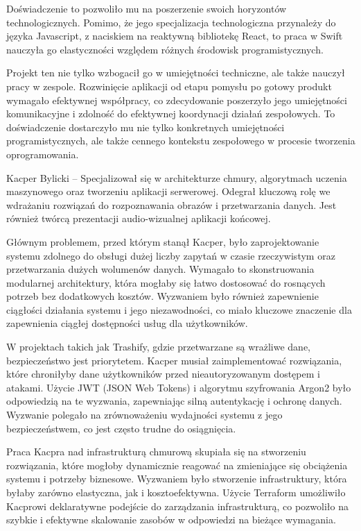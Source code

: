 \documentclass[12pt, a4paper, twoside, openany]{book}
\begin{document}
{Doświadczenie to pozwoliło mu na poszerzenie swoich horyzontów technologicznych. Pomimo, że jego specjalizacja technologiczna przynależy do języka Javascript, z naciskiem na reaktywną bibliotekę React, to praca w Swift nauczyła go elastyczności względem różnych środowisk programistycznych.

Projekt ten nie tylko wzbogacił go w umiejętności techniczne, ale także nauczył pracy w zespole. Rozwinięcie aplikacji od etapu pomysłu po gotowy produkt wymagało efektywnej współpracy, co zdecydowanie poszerzyło jego umiejętności komunikacyjne i zdolność do efektywnej koordynacji działań zespołowych. To doświadczenie dostarczyło mu nie tylko konkretnych umiejętności programistycznych, ale także cennego kontekstu zespołowego w procesie tworzenia oprogramowania.

Kacper Bylicki -- Specjalizował się w architekturze chmury, algorytmach uczenia maszynowego oraz tworzeniu aplikacji serwerowej. Odegrał kluczową rolę we wdrażaniu rozwiązań do rozpoznawania obrazów i przetwarzania danych. Jest również twórcą prezentacji audio-wizualnej aplikacji końcowej.

Głównym problemem, przed którym stanął Kacper, było zaprojektowanie systemu zdolnego do obsługi dużej liczby zapytań w czasie rzeczywistym oraz przetwarzania dużych wolumenów danych. Wymagało to skonstruowania modularnej architektury, która mogłaby się łatwo dostosować do rosnących potrzeb bez dodatkowych kosztów. Wyzwaniem było również zapewnienie ciągłości działania systemu i jego niezawodności, co miało kluczowe znaczenie dla zapewnienia ciągłej dostępności usług dla użytkowników.

W projektach takich jak Trashify, gdzie przetwarzane są wrażliwe dane, bezpieczeństwo jest priorytetem. Kacper musiał zaimplementować rozwiązania, które chroniłyby dane użytkowników przed nieautoryzowanym dostępem i atakami. Użycie JWT (JSON Web Tokens) i algorytmu szyfrowania Argon2 było odpowiedzią na te wyzwania, zapewniając silną autentykację i ochronę danych. Wyzwanie polegało na zrównoważeniu wydajności systemu z jego bezpieczeństwem, co jest często trudne do osiągnięcia.

Praca Kacpra nad infrastrukturą chmurową skupiała się na stworzeniu rozwiązania, które mogłoby dynamicznie reagować na zmieniające się obciążenia systemu i potrzeby biznesowe. Wyzwaniem było stworzenie infrastruktury, która byłaby zarówno elastyczna, jak i kosztoefektywna. Użycie Terraform umożliwiło Kacprowi deklaratywne podejście do zarządzania infrastrukturą, co pozwoliło na szybkie i efektywne skalowanie zasobów w odpowiedzi na bieżące wymagania.

}
\end{document}
